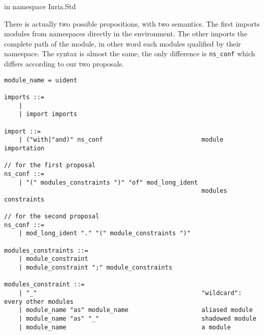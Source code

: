 \documentclass[11pt,a4paper]{article}
\begin{document}
\begin{OCaml}
in namespace Inria.Std
\end{OCaml}



\medskip

There is actually two possible propositions, with two semantics. The first
imports modules from namespaces directly in the environment. The other imports
the complete path of the module, in other word each modules qualified by their
namespace. The syntax is almost the same, the only difference is
\texttt{ns\_conf} which differs according to our two proposals. 


\begin{verbatim}
module_name = uident

imports ::=
    | 
    | import imports 

import ::=
    | ("with|"and)" ns_conf                           module importation    

// for the first proposal
ns_conf ::=
    | "(" modules_constraints ")" "of" mod_long_ident 
                                                      modules constraints

// for the second proposal
ns_conf ::=
    | mod_long_ident "." "(" module_constraints ")"

modules_constraints ::=
    | module_constraint
    | module_constraint ";" module_constraints

modules_constraint ::=
    | "_"                                             "wildcard": every other modules
    | module_name "as" module_name                    aliased module
    | module_name "as" "_"                            shadowed module
    | module_name                                     a module
\end{verbatim}
\end{document}
